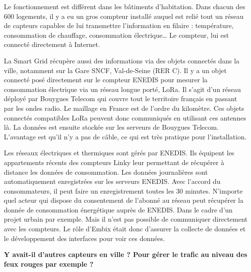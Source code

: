 Le fonctionnement est différent dans les bâtiments d'habitation.
Dans chacun des 600 logements, il y a eu un gros compteur installé
auquel est relié tout un réseau de capteurs capables de lui transmettre l’information en filaire :
température, consommation de chauffage, consommation électrique\dots
Le compteur, lui est connecté directement à Internet.

La Smart Grid récupère aussi des informations via des objets connectés dans la ville,
notamment sur la Gare SNCF, Val-de-Seine (RER C).
Il y a un objet connecté posé directement sur le compteur ENEDIS pour mesurer la consommation électrique via un réseau longue porté, LoRa.
Il s’agit d’un réseau déployé par Bouygues Telecom qui couvre tout le territoire français en passant par les ondes radio.
Le maillage en France est de l’ordre du kilomètre.
Ces objets connectés compatibles LoRa peuvent donc communiqués en utilisant ces antennes là.
La données est ensuite stockée sur les serveurs de Bouygues Telecom.
L’avantage est qu’il n’y a pas de câble, ce qui est très pratique pour l’installation.

Les réseaux électriques et thermiques sont gérés par ENEDIS.
Ils équipent les appartements récents des compteurs Linky leur permettant de récupérer à distance les données de consommation.
Les données journalières sont automatiquement enregistrées sur les serveurs ENEDIS.
Avec l’accord du consommateurs, il peut faire un enregistrement toutes les 30 minutes.
N’importe quel acteur qui dispose du consentement de l’abonné au réseau peut récupérer la donnée de consommation énergétique auprès de ENEDIS.
Dans le cadre d’un projet urbain par exemple.
Mais il n'est pas possible de communiquer directement avec les compteurs.
Le rôle d'Embix était donc d'assurer la collecte de données et le développement des interfaces pour voir ces données.

\textbf{Y avait-il d'autres capteurs en ville ? Pour gérer le trafic au niveau des feux rouges par exemple ?}


